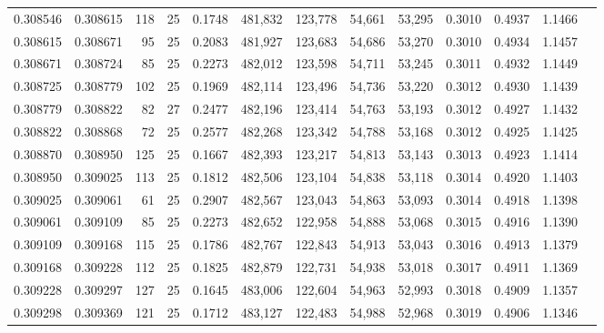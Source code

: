 \begin{tabular}{rrrrrrrrrrrrr}
0.308546 & 0.308615 &   118 &  25 &                                     0.1748 & 481,832 & 123,778 &  54,661 &  53,295 & 0.3010 & 0.4937 & 1.1466 \\
0.308615 & 0.308671 &    95 &  25 &                                     0.2083 & 481,927 & 123,683 &  54,686 &  53,270 & 0.3010 & 0.4934 & 1.1457 \\
0.308671 & 0.308724 &    85 &  25 &                                     0.2273 & 482,012 & 123,598 &  54,711 &  53,245 & 0.3011 & 0.4932 & 1.1449 \\
0.308725 & 0.308779 &   102 &  25 &                                     0.1969 & 482,114 & 123,496 &  54,736 &  53,220 & 0.3012 & 0.4930 & 1.1439 \\
0.308779 & 0.308822 &    82 &  27 &                                     0.2477 & 482,196 & 123,414 &  54,763 &  53,193 & 0.3012 & 0.4927 & 1.1432 \\
0.308822 & 0.308868 &    72 &  25 &                                     0.2577 & 482,268 & 123,342 &  54,788 &  53,168 & 0.3012 & 0.4925 & 1.1425 \\
0.308870 & 0.308950 &   125 &  25 &                                     0.1667 & 482,393 & 123,217 &  54,813 &  53,143 & 0.3013 & 0.4923 & 1.1414 \\
0.308950 & 0.309025 &   113 &  25 &                                     0.1812 & 482,506 & 123,104 &  54,838 &  53,118 & 0.3014 & 0.4920 & 1.1403 \\
0.309025 & 0.309061 &    61 &  25 &                                     0.2907 & 482,567 & 123,043 &  54,863 &  53,093 & 0.3014 & 0.4918 & 1.1398 \\
0.309061 & 0.309109 &    85 &  25 &                                     0.2273 & 482,652 & 122,958 &  54,888 &  53,068 & 0.3015 & 0.4916 & 1.1390 \\
0.309109 & 0.309168 &   115 &  25 &                                     0.1786 & 482,767 & 122,843 &  54,913 &  53,043 & 0.3016 & 0.4913 & 1.1379 \\
0.309168 & 0.309228 &   112 &  25 &                                     0.1825 & 482,879 & 122,731 &  54,938 &  53,018 & 0.3017 & 0.4911 & 1.1369 \\
0.309228 & 0.309297 &   127 &  25 &                                     0.1645 & 483,006 & 122,604 &  54,963 &  52,993 & 0.3018 & 0.4909 & 1.1357 \\
0.309298 & 0.309369 &   121 &  25 &                                     0.1712 & 483,127 & 122,483 &  54,988 &  52,968 & 0.3019 & 0.4906 & 1.1346 \\

\end{tabular}

